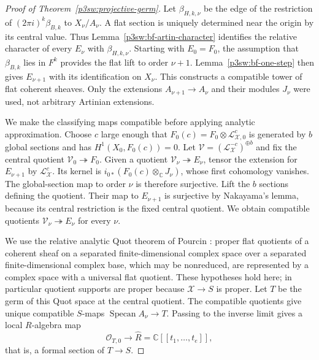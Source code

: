 \documentclass[11pt]{article}
\newcommand{\C}{\mathbb C}
\numberwithin{equation}{section}
\begin{document}
\begin{proof}[Proof of Theorem~\ref{p3sw:projective-germ}]
Let \(\beta_{H,k,\nu}\) be the edge of the restriction of
\((2\pi i)^k\beta_{B,k}\) to \(X_\nu/A_\nu\).  A flat section
is uniquely determined near the origin by its central value.
Thus Lemma~\ref{p3sw:bf-artin-character} identifies the
relative character of every \(E_\nu\) with
\(\beta_{H,k,\nu}\).  Starting with \(E_0=F_0\), the
assumption that \(\beta_{B,k}\) lies in \(F^k\) provides the
flat lift to order \(\nu+1\).  Lemma~\ref{p3sw:bf-one-step}
then gives \(E_{\nu+1}\) with its identification on \(X_\nu\).
This constructs a compatible tower of flat coherent sheaves.
Only the extensions \(A_{\nu+1}\to A_\nu\) and their modules
\(J_\nu\) were used, not arbitrary Artinian extensions.

We make the classifying maps compatible before applying analytic
approximation.  Choose \(c\) large enough that
\(F_0(c)=F_0\otimes\mathcal L_{\mathcal X,0}^{c}\) is generated
by \(b\) global sections and has \(H^1(X_0,F_0(c))=0\).
Let
\(\mathcal V=(\mathcal L_{\mathcal X}^{-c})^{\oplus b}\)
and fix the central quotient
\(\mathcal V_0\twoheadrightarrow F_0\).  Given a quotient
\(\mathcal V_\nu\twoheadrightarrow E_\nu\), tensor the
extension for \(E_{\nu+1}\) by
\(\mathcal L_{\mathcal X}^{c}\).  Its kernel is
\(i_{0*}(F_0(c)\otimes_\C J_\nu)\), whose first cohomology
vanishes.  The global-section map to order \(\nu\) is therefore
surjective.  Lift the \(b\) sections defining the quotient.
Their map to \(E_{\nu+1}\) is surjective by Nakayama's lemma,
because its central restriction is the fixed central quotient.
We obtain compatible quotients
\(\mathcal V_\nu\twoheadrightarrow E_\nu\) for every \(\nu\).

We use the relative analytic Quot theorem of Pourcin
\cite[Theorem~2, pp.~451--452]{P3SWPourcin1969}: proper flat
quotients of a coherent sheaf on a separated finite-dimensional
complex space over a separated finite-dimensional complex base,
which may be nonreduced, are represented by a complex space
with a universal flat quotient.  These hypotheses hold here;
in particular quotient supports are proper because
\(\mathcal X\to S\) is proper.  Let \(T\) be the germ of this
Quot space at the central quotient.  The compatible quotients
give unique compatible \(S\)-maps
\(\operatorname{Specan}A_\nu\to T\).  Passing to the inverse
limit gives a local \(R\)-algebra map
\[
 \mathcal O_{T,0}\longrightarrow\widehat R
          =\C[[t_1,\ldots,t_e]],
\]
that is, a formal section of \(T\to S\).


\end{proof}
\end{document}
